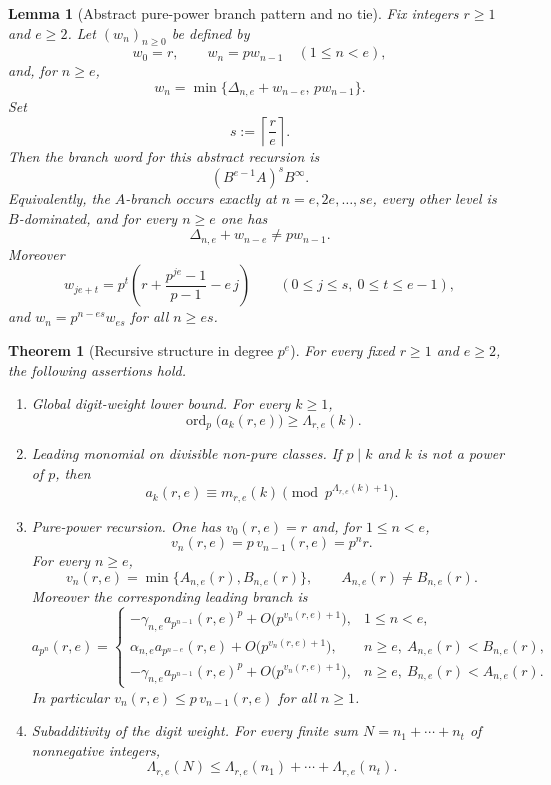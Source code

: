\documentclass[10pt,a4paper]{amsart}
\newtheorem{theorem}{Theorem}
\newtheorem{lemma}{Lemma}
\newcommand{\bigo}{O}
\DeclareMathOperator{\ordop}{ord}
\newcommand{\vp}{\ordop_p}
\begin{document}
\begin{lemma}[Abstract pure-power branch pattern and no tie]
\label{lem:abstract-branch-pe}
Fix integers $r\ge1$ and $e\ge2$.  Let $(w_n)_{n\ge0}$ be defined by
\[
        w_0=r,
        \qquad
        w_n=pw_{n-1}\quad(1\le n<e),
\]
and, for $n\ge e$,
\[
        w_n=\min\{\Delta_{n,e}+w_{n-e},\,p w_{n-1}\}.
\]
Set
\[
        s:=\left\lceil\frac r e\right\rceil.
\]
Then the branch word for this abstract recursion is
\[
        (B^{e-1}A)^sB^\infty.
\]
Equivalently, the $A$-branch occurs exactly at $n=e,2e,\ldots,se$, every other level is $B$-dominated, and for every $n\ge e$ one has
\[
        \Delta_{n,e}+w_{n-e}\ne p w_{n-1}.
\]
Moreover
\[
        w_{je+t}=p^t\left(r+\frac{p^{j e}-1}{p-1}-e\,j\right)
        \qquad(0\le j\le s,\ 0\le t\le e-1),
\]
and $w_n=p^{n-e s}w_{e s}$ for all $n\ge e s$.
\end{lemma}

\begin{theorem}[Recursive structure in degree $p^e$]\label{thm:higher-structure}
For every fixed $r\ge 1$ and $e\ge 2$, the following assertions hold.
\begin{enumerate}[label=\textup{(\arabic*)},leftmargin=2.2em]
\item \emph{Global digit-weight lower bound.}  For every $k\ge 1$,
\[
        \vp\bigl(a_k(r,e)\bigr)\ge \Lambda_{r,e}(k).
\]
\item \emph{Leading monomial on divisible non-pure classes.}  If $p\mid k$ and $k$ is not a power of $p$, then
\[
        a_k(r,e)\equiv m_{r,e}(k)\pmod {p^{\Lambda_{r,e}(k)+1}}.
\]
\item \emph{Pure-power recursion.}  One has $v_0(r,e)=r$ and, for $1\le n<e$,
\[
        v_n(r,e)=p\,v_{n-1}(r,e)=p^nr.
\]
For every $n\ge e$,
\[
        v_n(r,e)=\min\{A_{n,e}(r),B_{n,e}(r)\},
        \qquad
        A_{n,e}(r)\ne B_{n,e}(r).
\]
Moreover the corresponding leading branch is
\[
        a_{p^n}(r,e)=
        \begin{cases}
        -\gamma_{n,e}a_{p^{n-1}}(r,e)^p+\bigo\bigl(p^{v_n(r,e)+1}\bigr),&1\le n<e,\\[1mm]
        \alpha_{n,e}a_{p^{n-e}}(r,e)+\bigo\bigl(p^{v_n(r,e)+1}\bigr),& n\ge e,\ A_{n,e}(r)<B_{n,e}(r),\\[1mm]
        -\gamma_{n,e}a_{p^{n-1}}(r,e)^p+\bigo\bigl(p^{v_n(r,e)+1}\bigr),& n\ge e,\ B_{n,e}(r)<A_{n,e}(r).
        \end{cases}
\]
In particular $v_n(r,e)\le p\,v_{n-1}(r,e)$ for all $n\ge 1$.
\item \emph{Subadditivity of the digit weight.}  For every finite sum $N=n_1+\cdots+n_t$ of nonnegative integers,
\[
        \Lambda_{r,e}(N)\le \Lambda_{r,e}(n_1)+\cdots+\Lambda_{r,e}(n_t).
\]
\end{enumerate}
\end{theorem}
\end{document}
